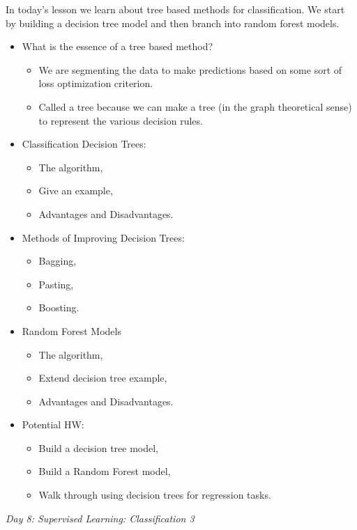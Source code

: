 \documentclass[12pt]{article}
\begin{document}
	\noindent
	In today's lesson we learn about tree based methods for classification. We start by building a decision tree model and then branch into random forest models.
	\begin{itemize}
		\item What is the essence of a tree based method?
			\begin{itemize}
				\item We are segmenting the data to make predictions based on some sort of loss optimization criterion.
				\item Called a tree because we can make a tree (in the graph theoretical sense) to represent the various decision rules.
			\end{itemize}
		\item Classification Decision Trees:
			\begin{itemize}
				\item The algorithm,
				\item Give an example,
				\item Advantages and Disadvantages.
			\end{itemize}
		\item Methods of Improving Decision Trees:
			\begin{itemize}
				\item Bagging,
				\item Pasting,
				\item Boosting.
			\end{itemize}
		\item Random Forest Models
			\begin{itemize}
				\item The algorithm,
				\item Extend decision tree example,
				\item Advantages and Disadvantages.
			\end{itemize}
		\item Potential HW:
			\begin{itemize}
				\item Build a decision tree model,
				\item Build a Random Forest model,
				\item Walk through using decision trees for regression tasks.
			\end{itemize}
	\end{itemize}
	
	\vspace{2mm}
	\noindent
	\textit{\large{Day 8: Supervised Learning: Classification 3}}
	
\end{document}
